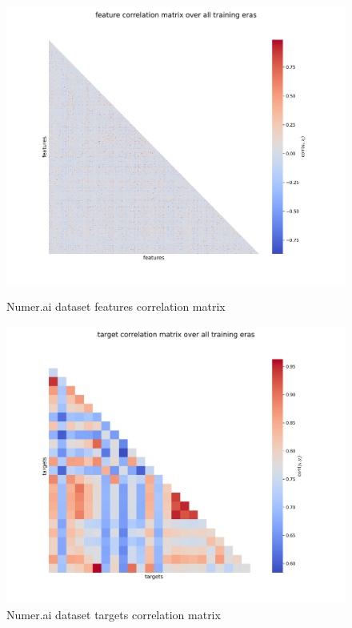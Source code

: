 \documentclass[12pt, a4paper]{article}
\begin{document}
\begin{figure}[htbp]
\begin{minipage}[t]{9cm}
\vspace{0pt}
    \centering
    \includegraphics[width=1\textwidth,trim={0 0 0 0},clip]{figures/feature_correlations_matrix_2023-11-18.png}
    \caption[Numer.ai dataset features correlation matrix]{Numer.ai dataset features correlation matrix}
    \label{fig: numerai_features_correlation_matrix}
\end{minipage}
\hfill
\begin{minipage}[t]{9cm}
\vspace{0pt}
    \centering
    \includegraphics[width=1\textwidth,trim={0 0 0 0},clip]{figures/target_correlations_matrix_2023-11-18.png}
    \caption[Numer.ai dataset targets correlation matrix]{Numer.ai dataset targets correlation matrix}
    \label{fig: numerai_targets_correlation_matrix}
\end{minipage}
\end{figure}
\end{document}
